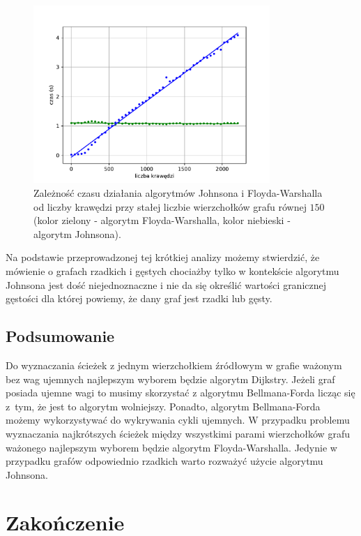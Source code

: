 \documentclass[12pt,a4paper]{book}
\theoremstyle{definition}
\numberwithin{equation}{chapter}
\begin{document}
\begin{figure}[H]
\centering
\includegraphics[width=0.8\textwidth]{images/Wykres_granica_gestego_grafu_150_wierzcholkow.pdf}
\caption{Zależność czasu działania algorytmów Johnsona i Floyda-Warshalla od liczby krawędzi przy stałej liczbie wierzchołków grafu równej $150$ (kolor zielony - algorytm Floyda-Warshalla, kolor niebieski - algorytm Johnsona).}
\label{rys_wykres_gran_gest_150}
\end{figure}

Na podstawie przeprowadzonej tej krótkiej analizy możemy stwierdzić, że mówienie o grafach rzadkich i gęstych chociażby tylko w kontekście algorytmu Johnsona jest dość niejednoznaczne i nie da się określić wartości granicznej gęstości dla której powiemy, że dany graf jest rzadki lub gęsty.

\section{Podsumowanie}

Do wyznaczania ścieżek z jednym wierzchołkiem źródłowym w grafie ważonym bez wag ujemnych najlepszym wyborem będzie algorytm Dijkstry. Jeżeli graf posiada ujemne wagi to musimy skorzystać z algorytmu Bellmana-Forda licząc się z~tym, że jest to algorytm wolniejszy. Ponadto, algorytm  Bellmana-Forda możemy wykorzystywać do wykrywania cykli ujemnych. W przypadku problemu wyznaczania najkrótszych ścieżek między wszystkimi parami wierzchołków grafu ważonego najlepszym wyborem będzie algorytm Floyda-Warshalla. Jedynie w przypadku grafów odpowiednio rzadkich warto rozważyć użycie algorytmu Johnsona.

\chapter*{Zakończenie}
\end{document}
